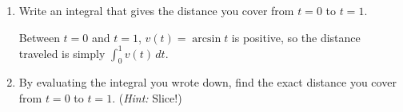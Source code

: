 \documentclass{article}
\begin{document}
\begin{enumerate}
\begin{enumerate}
    \begin{enumerate}
    \item
      \begin{problem}[1in]
        Write an integral that gives the distance you cover from $t = 0$
        to $t = 1$. 
      \end{problem}

      \begin{solution}
        Between $t = 0$ and $t = 1$, $v(t) = \arcsin t$ is positive, so
        the distance traveled is simply $\boxed{ \int_0^1 v(t)\,dt}$.
      \end{solution}

    \item

      \begin{problem}[\newpage]
        By evaluating the integral you wrote down, find the exact distance
        you cover from $t= 0$ to $t = 1$.  (\emph{Hint:} Slice!)
      \end{problem}


\end{enumerate}
\end{enumerate}
\end{enumerate}
\end{document}
